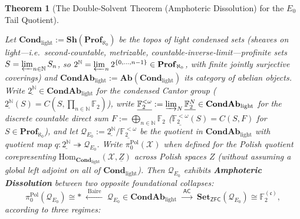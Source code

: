 \documentclass[10pt,twoside,openright]{book}
\theoremstyle{crmplain}
\newtheorem{theorem}{Theorem}[section]
\theoremstyle{crmdef}
\theoremstyle{crmremark}
\newcommand{\lean}[1]{\ignorespaces}
\newcommand{\leanwitness}{\ignorespaces}
\begin{document}
\begin{theorem}[The Double-Solvent Theorem (Amphoteric Dissolution) for the $E_0$ Tail Quotient]\label{thm:double-solvent-r4}%
\lean{HomotopyCRM.exists_zfc_linear_section_e0Quotient, HomotopyCRM.nonempty_linearEquiv_cantor_prod_e0Quotient, HomotopyCRM.dense_e0Coset, HomotopyCRM.continuous_e0Invariant_const, HomotopyCRM.not_exists_continuous_t1_e0Separator, HomotopyCRM.chapter4_borel_tail_residuum_summary}%
\leanwitness%
%

Let $\mathbf{Cond}_{\mathrm{light}} := \mathbf{Sh}(\mathbf{Prof}_{\aleph_0})$ be the topos of light condensed sets (sheaves on \emph{light}---i.e.\ second-countable, metrizable, countable-inverse-limit---profinite sets $S = \varprojlim_{n \in \mathbb{N}} S_n$, so $2^{\mathbb{N}} = \varprojlim_n 2^{\{0,\dots,n-1\}} \in \mathbf{Prof}_{\aleph_0}$, with finite jointly surjective coverings) and $\mathbf{CondAb}_{\mathrm{light}} := \mathbf{Ab}(\mathbf{Cond}_{\mathrm{light}})$ its category of abelian objects. Write $\underline{2^{\mathbb{N}}} \in \mathbf{CondAb}_{\mathrm{light}}$ for the condensed Cantor group ($\underline{2^{\mathbb{N}}}(S) = C(S, \prod_{n \in \mathbb{N}} \mathbb{F}_2)$), write $\underline{\mathbb{F}_2^{<\omega}} := \varinjlim_N \underline{\mathbb{F}_2^N} \in \mathbf{CondAb}_{\mathrm{light}}$ for the discrete countable direct sum $F := \bigoplus_{n \in \mathbb{N}} \mathbb{F}_2$ ($\underline{\mathbb{F}_2^{<\omega}}(S) = C(S, F)$ for $S \in \mathbf{Prof}_{\aleph_0}$), and let $\mathcal{Q}_{E_0} := \underline{2^{\mathbb{N}}} / \underline{\mathbb{F}_2^{<\omega}}$ be the quotient in $\mathbf{CondAb}_{\mathrm{light}}$ with quotient map $q : \underline{2^{\mathbb{N}}} \twoheadrightarrow \mathcal{Q}_{E_0}$. Write $\pi_0^{\mathrm{Pol}}(\mathcal{X})$ when defined for the Polish quotient corepresenting $\mathrm{Hom}_{\mathbf{Cond}_{\mathrm{light}}}(\mathcal{X}, \underline{Z})$ across Polish spaces $Z$ (without assuming a global left adjoint on all of $\mathbf{Cond}_{\mathrm{light}}$). Then $\mathcal{Q}_{E_0}$ exhibits \textbf{Amphoteric Dissolution} between two opposite foundational collapses:
\[
  \pi_0^{\mathrm{Pol}}(\mathcal{Q}_{E_0}) \cong * \;\xleftarrow{\;\mathrm{Baire}\;}\; \mathcal{Q}_{E_0} \in \mathbf{CondAb}_{\mathrm{light}} \;\xrightarrow{\;\mathsf{AC}\;}\; \mathbf{Set}_{\mathsf{ZFC}}(\mathcal{Q}_{E_0}) \cong \mathbb{F}_2^{(\mathfrak{c})},
\]
according to three regimes:
\begin{enumerate}[label=\textup{(\roman*)},leftmargin=2.0em]

\end{enumerate}
\end{theorem}
\end{document}
